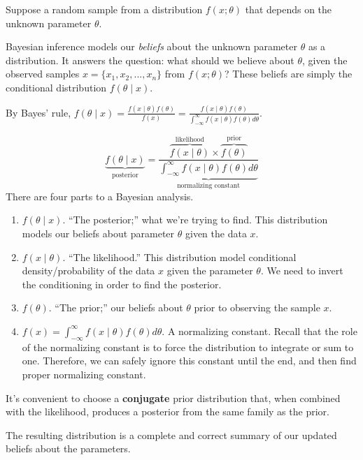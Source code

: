 \documentclass[
]{book}
\providecommand{\tightlist}{%
  \setlength{\itemsep}{0pt}\setlength{\parskip}{0pt}}
\begin{document}
Suppose a random sample from a distribution \(f(x; \theta)\) that
depends on the unknown parameter \(\theta\).

Bayesian inference models our \emph{beliefs} about the unknown parameter
\(\theta\) as a distribution. It answers the question: what should we
believe about \(\theta\), given the observed samples
\(x = \{x_1, x_2, ..., x_n\}\) from \(f(x; \theta)\)? These beliefs are
simply the conditional distribution \(f(\theta \mid x)\).

By Bayes' rule,
\(\displaystyle f(\theta \mid x) = \frac{f(x \mid \theta)f(\theta)}{f(x)} = \frac{f(x \mid \theta)f(\theta)}{\displaystyle \int_{-\infty}^\infty f(x \mid \theta)f(\theta) d\theta}\).

\[
\displaystyle \underbrace{f(\theta \mid x)}_{\text{posterior}} = \frac{\overbrace{f(x \mid \theta)}^{\text{likelihood}} \times \overbrace{f(\theta)}^{\text{prior}}}{\displaystyle \underbrace{\int_{-\infty}^\infty f(x \mid \theta)f(\theta) d\theta}_{\text{normalizing constant}}}
\] There are four parts to a Bayesian analysis.

\begin{enumerate}
\def\labelenumi{\arabic{enumi}.}
\tightlist
\item
  \(f(\theta \mid x)\). ``The posterior;'' what we're trying to find.
  This distribution models our beliefs about parameter \(\theta\) given
  the data \(x\).
\item
  \(f(x \mid \theta)\). ``The likelihood.'' This distribution model
  conditional density/probability of the data \(x\) given the parameter
  \(\theta\). We need to invert the conditioning in order to find the
  posterior.
\item
  \(f(\theta)\). ``The prior;'' our beliefs about \(\theta\) prior to
  observing the sample \(x\).
\item
  \(f(x) =\int_{-\infty}^\infty f(x \mid \theta)f(\theta) d\theta\). A
  normalizing constant. Recall that the role of the normalizing constant
  is to force the distribution to integrate or sum to one. Therefore, we
  can safely ignore this constant until the end, and then find proper
  normalizing constant.
\end{enumerate}

It's convenient to choose a \textbf{conjugate} prior distribution that,
when combined with the likelihood, produces a posterior from the same
family as the prior.

The resulting distribution is a complete and correct summary of our
updated beliefs about the parameters.
\end{document}
